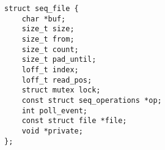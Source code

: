 
\begin{lstlisting}
struct seq_file {
	char *buf;
	size_t size;
	size_t from;
	size_t count;
	size_t pad_until;
	loff_t index;
	loff_t read_pos;
	struct mutex lock;
	const struct seq_operations *op;
	int poll_event;
	const struct file *file;
	void *private;
};
\end{lstlisting}
